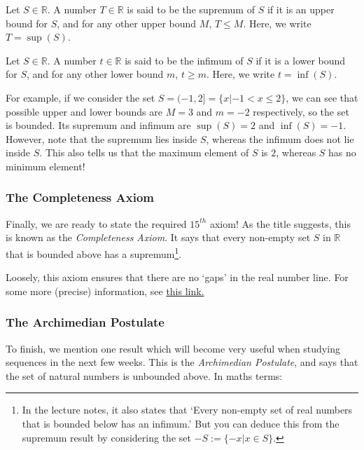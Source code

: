 \documentclass[
  17pt,
  a4paper]{extarticle}
\theoremstyle{plain}
\theoremstyle{definition}
\theoremstyle{plain}
\theoremstyle{plain}
\theoremstyle{plain}
\theoremstyle{plain}
\theoremstyle{definition}
\theoremstyle{definition}
\newtheorem*{Order Axioms*}{Order Axioms}\newtheorem{Order Axioms}{Order Axioms}[section]
\theoremstyle{remark}
\theoremstyle{remark}
\let\BeginKnitrBlock\begin \let\EndKnitrBlock\end
\renewcommand{\;}{\,}
\begin{document}
\BeginKnitrBlock{definition}[Supremum]
{\label{def:def4} }Let \(S \in \mathbb{R}\). A number \(T \in \mathbb{R}\) is said to be the supremum of \(S\) if it is an upper bound for \(S\), and for any other upper bound \(M\), \(T \leq M\). Here, we write \(T = \sup(S)\).
\EndKnitrBlock{definition}

\BeginKnitrBlock{definition}[Infimum]
{\label{def:def5} }Let \(S \in \mathbb{R}\). A number \(t \in \mathbb{R}\) is said to be the infimum of \(S\) if it is a lower bound for \(S\), and for any other lower bound \(m\), \(t\geq m\). Here, we write \(t = \inf(S)\).
\EndKnitrBlock{definition}

For example, if we consider the set \(S = (-1,2] = \lbrace x \lvert -1<x\leq2\rbrace\), we can see that possible upper and lower bounds are \(M = 3\) and \(m = -2\) respectively, so the set is bounded. Its supremum and infimum are \(\sup(S) = 2\) and \(\inf(S) = -1\). However, note that the supremum lies inside \(S\), whereas the infimum does not lie inside \(S\). This also tells us that the maximum element of \(S\) is \(2\), whereas \(S\) has no minimum element!

\hypertarget{the-completeness-axiom}{%
\subsubsection{The Completeness Axiom}\label{the-completeness-axiom}}

Finally, we are ready to state the required \(15^{th}\) axiom! As the title suggests, this is known as the \emph{Completeness Axiom}. It says that every non-empty set \(S\) in \(\mathbb{R}\) that is bounded above has a supremum\footnote{In the lecture notes, it also states that `Every non-empty set of real numbers that is bounded below has an infimum.' But you can deduce this from the supremum result by considering the set \(-S:=\lbrace -x \lvert x \in S\rbrace.\)}.

Loosely, this axiom ensures that there are no `gaps' in the real number line. For some more (precise) information, see \href{https://en.wikipedia.org/wiki/Completeness_of_the_real_numbers}{this link.}

\hypertarget{the-archimedian-postulate}{%
\subsubsection{The Archimedian Postulate}\label{the-archimedian-postulate}}

To finish, we mention one result which will become very useful when studying sequences in the next few weeks. This is the \emph{Archimedian Postulate}, and says that the set of natural numbers is unbounded above. In maths terms:
\end{document}
